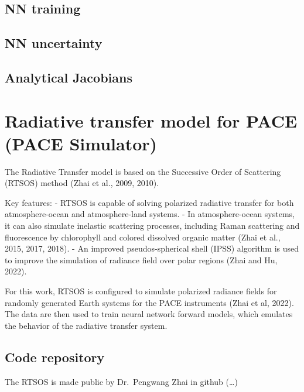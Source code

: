 \documentclass[
  letterpaper,
]{scrbook}
\begin{document}
\section{NN training}\label{nn-training}

\section{NN uncertainty}\label{nn-uncertainty}

\section{Analytical Jacobians}\label{analytical-jacobians}


\chapter{Radiative transfer model for PACE (PACE
Simulator)}\label{radiative-transfer-model-for-pace-pace-simulator}

The Radiative Transfer model is based on the Successive Order of
Scattering (RTSOS) method (Zhai et al., 2009, 2010).

Key features: - RTSOS is capable of solving polarized radiative transfer
for both atmosphere-ocean and atmosphere-land systems. - In
atmosphere-ocean systems, it can also simulate inelastic scattering
processes, including Raman scattering and fluorescence by chlorophyll
and colored dissolved organic matter (Zhai et al., 2015, 2017, 2018). -
An improved pseudos-spherical shell (IPSS) algorithm is used to improve
the simulation of radiance field over polar regions (Zhai and Hu, 2022).

For this work, RTSOS is configured to simulate polarized radiance fields
for randomly generated Earth systems for the PACE instruments (Zhai et
al, 2022). The data are then used to train neural network forward
models, which emulates the behavior of the radiative transfer system.

\section{Code repository}\label{code-repository}

The RTSOS is made public by Dr.~Pengwang Zhai in github (\ldots)


\chapter{}\label{section}
\end{document}
